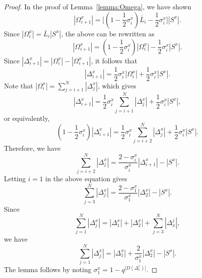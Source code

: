 \documentclass[10pt,journal,cspaper,compsoc]{IEEEtran}
\begin{document}
\begin{proof}
In the proof of Lemma~\ref{lemma:Omega}, we have shown
\begin{equation}
|\Omega_{i+1}^x|=\big[(1-\frac{1}{2}\sigma_i^x)\bar{L}_i-\frac{1}{2}\sigma_i^x\big]|S^x|.
\end{equation}
Since $|\Omega_i^x|=\bar{L}_i|S^x|$, the above can be rewritten as
\begin{equation}
|\Omega_{i+1}^x|=(1-\frac{1}{2}\sigma_i^x)|\Omega_i^x|-\frac{1}{2}\sigma_i^x|S^x|.
\end{equation}
Since $|\Delta_{i+1}^x|=|\Omega_i^x|-|\Omega_{i+1}^x|$, it follows that
\begin{equation}
|\Delta_{i+1}^x|=\frac{1}{2}\sigma_i^x|\Omega_i^x|+\frac{1}{2}\sigma_i^x|S^x|.
\end{equation}
Note that $|\Omega_i^x|=\sum_{j=i+1}^{N}|\Delta_j^x|$, which gives
\begin{equation}
|\Delta_{i+1}^x|=\frac{1}{2}\sigma_i^x\sum_{j=i+1}^{N}|\Delta_j^x|+\frac{1}{2}\sigma_i^x|S^x|,
\end{equation}
or equivalently,
\begin{equation}
(1-\frac{1}{2}\sigma_i^x)|\Delta_{i+1}^x|=\frac{1}{2}\sigma_i^x\sum_{j=i+2}^{N}|\Delta_j^x|+\frac{1}{2}\sigma_i^x|S^x|.
\end{equation}
Therefore, we have
\begin{equation}
\sum_{j=i+2}^{N}|\Delta_j^x|=\frac{2-\sigma_i^x}{\sigma_i^x}|\Delta_{i+1}^x|-|S^x|.
\end{equation}
Letting $i=1$ in the above equation gives
\begin{equation}
\sum_{j=3}^{N}|\Delta_j^x|=\frac{2-\sigma_1^x}{\sigma_1^x}|\Delta_2^x|-|S^x|.
\end{equation}
Since 
\begin{equation}
\sum_{j=1}^{N}|\Delta_j^x|=|\Delta_1^x|+|\Delta_2^x|+\sum_{j=3}^{N}|\Delta_x^j|,
\end{equation}
we have
\begin{equation}
\sum_{j=1}^{N}|\Delta_j^x|=|\Delta_1^x|+\frac{2}{\sigma_1^x}|\Delta_2^x|-|S^x|.
\end{equation}
The lemma follows by noting $\sigma_1^x=1-q^{|D(\Delta_1^x)|}$.
\end{proof}
\end{document}
